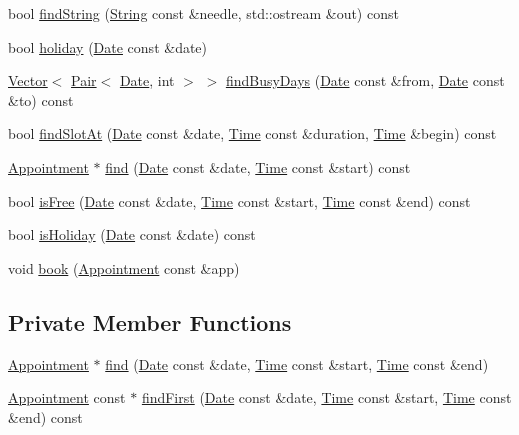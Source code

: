 \begin{DoxyCompactItemize}
\item 
bool \hyperlink{classCalendar_accc025455e06e4031b9b76fe1a35220d}{find\+String} (\hyperlink{classString}{String} const \&needle, std\+::ostream \&out) const
\item 
bool \hyperlink{classCalendar_aa54f943234aebe06350ae6545804dd0a}{holiday} (\hyperlink{classDate}{Date} const \&date)
\item 
\hyperlink{classVector}{Vector}$<$ \hyperlink{structPair}{Pair}$<$ \hyperlink{classDate}{Date}, int $>$ $>$ \hyperlink{classCalendar_a33727e15bb2186dbdc1fe227dfa0a6e6}{find\+Busy\+Days} (\hyperlink{classDate}{Date} const \&from, \hyperlink{classDate}{Date} const \&to) const
\item 
bool \hyperlink{classCalendar_aecc060737b760817e814121df59a9316}{find\+Slot\+At} (\hyperlink{classDate}{Date} const \&date, \hyperlink{classTime}{Time} const \&duration, \hyperlink{classTime}{Time} \&begin) const
\item 
\hyperlink{classAppointment}{Appointment} $\ast$ \hyperlink{classCalendar_a249805cf48297698e30512ff9a47bac3}{find} (\hyperlink{classDate}{Date} const \&date, \hyperlink{classTime}{Time} const \&start) const
\item 
bool \hyperlink{classCalendar_abd5c6a36628d47bae770f807254fb639}{is\+Free} (\hyperlink{classDate}{Date} const \&date, \hyperlink{classTime}{Time} const \&start, \hyperlink{classTime}{Time} const \&end) const
\item 
bool \hyperlink{classCalendar_ae1d1e8979866bb2d03c4e66d801fdebf}{is\+Holiday} (\hyperlink{classDate}{Date} const \&date) const
\item 
void \hyperlink{classCalendar_a1dbd9019e73644ee8bf5611884ac5d75}{book} (\hyperlink{classAppointment}{Appointment} const \&app)
\end{DoxyCompactItemize}
\subsection*{Private Member Functions}
\begin{DoxyCompactItemize}
\item 
\hyperlink{classAppointment}{Appointment} $\ast$ \hyperlink{classCalendar_a9211e4068cad119ff203509c9cb50ef1}{find} (\hyperlink{classDate}{Date} const \&date, \hyperlink{classTime}{Time} const \&start, \hyperlink{classTime}{Time} const \&end)
\item 
\hyperlink{classAppointment}{Appointment} const  $\ast$ \hyperlink{classCalendar_a870fea13a7c605023a6b4cd70b5a9727}{find\+First} (\hyperlink{classDate}{Date} const \&date, \hyperlink{classTime}{Time} const \&start, \hyperlink{classTime}{Time} const \&end) const
\end{DoxyCompactItemize}
